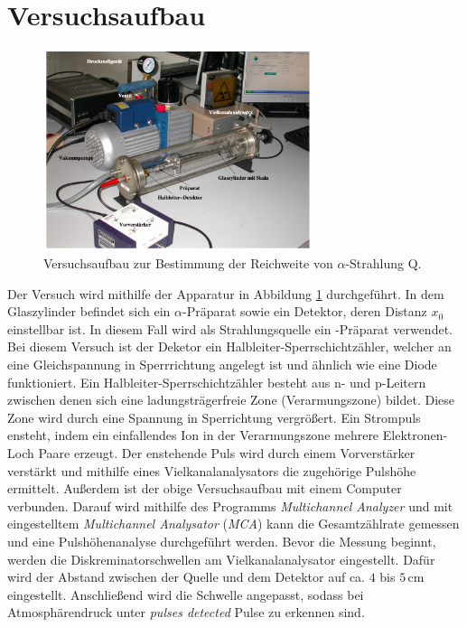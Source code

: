 \section{Versuchsaufbau}
\label{sec:Versuchsaufbau}
\nocite{Halbleiter}
\begin{figure}[H]
  \centering
  \includegraphics[width=0.7\textwidth]{content/Bilder/Messapparatur.png}
  \caption{Versuchsaufbau zur Bestimmung der Reichweite von $\alpha$-Strahlung Q\cite{anleitungV701}.}
  \label{fig:Messapparatur}
\end{figure}
Der Versuch wird mithilfe der Apparatur in Abbildung \ref{fig:Messapparatur} durchgeführt. In dem Glaszylinder 
befindet sich ein $\alpha$-Präparat sowie ein Detektor, deren Distanz $x_0$ einstellbar ist. In diesem Fall wird als 
Strahlungsquelle ein -Präparat verwendet. Bei diesem Versuch ist der Deketor ein Halbleiter-Sperrschichtzähler, welcher an eine 
Gleichspannung in Sperrrichtung angelegt ist und ähnlich wie eine Diode funktioniert. Ein Halbleiter-Sperrschichtzähler besteht aus
n- und p-Leitern zwischen denen sich eine ladungsträgerfreie Zone (Verarmungszone) bildet. Diese Zone wird durch eine Spannung in Sperrichtung vergrößert. 
Ein Strompuls ensteht, indem ein einfallendes Ion in der Verarmungszone mehrere Elektronen-Loch Paare erzeugt. Der enstehende Puls wird durch einem
Vorverstärker verstärkt und mithilfe eines Vielkanalanalysators die zugehörige Pulshöhe ermittelt. Außerdem ist der obige Versuchsaufbau
mit einem Computer verbunden. Darauf wird mithilfe des Programms \textit{Multichannel Analyzer} und mit eingestelltem \textit{Multichannel Analysator} (\textit{MCA})
kann die Gesamtzählrate gemessen und eine Pulshöhenanalyse durchgeführt werden. Bevor die Messung beginnt, werden die Diskreminatorschwellen
am Vielkanalanalysator eingestellt. Dafür wird der Abstand zwischen der Quelle und dem Detektor auf ca. $4$ bis $5\,\unit{\centi\metre}$ eingestellt. 
Anschließend wird die Schwelle angepasst, sodass bei Atmosphärendruck unter \textit{pulses detected} Pulse zu erkennen sind. 


